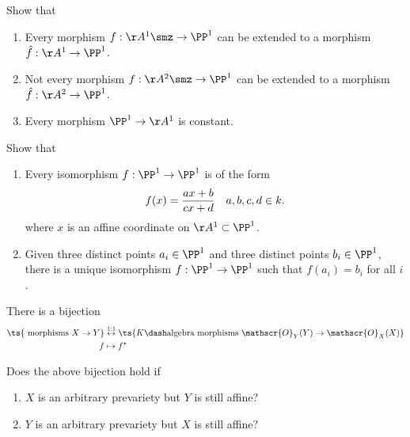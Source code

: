 \begin{exercise}[Gathmann 5.7]

Show that

\begin{enumerate}
\def\labelenumi{\alph{enumi}.}
\item
  Every morphism \(f:\AA^1\smz \to \PP^1\) can be extended to a morphism
  \(\hat f: \AA^1 \to \PP^1\).
\item
  Not every morphism \(f:\AA^2\smz \to \PP^1\) can be extended to a
  morphism \(\hat f: \AA^2 \to \PP^1\).
\item
  Every morphism \(\PP^1\to \AA^1\) is constant.
\end{enumerate}

\end{exercise}

\begin{exercise}[Gathmann 5.8]

Show that

\begin{enumerate}
\def\labelenumi{\alph{enumi}.}
\item
  Every isomorphism \(f:\PP^1\to \PP^1\) is of the form
  \begin{align*}  
  f(x) = {ax+b \over cx+d} && a,b,c,d\in k
  .\end{align*} where \(x\) is an affine coordinate on
  \(\AA^1\subset \PP^1\).
\item
  Given three distinct points \(a_i \in \PP^1\) and three distinct
  points \(b_i \in \PP^1\), there is a unique isomorphism
  \(f:\PP^1 \to \PP^1\) such that \(f(a_i) = b_i\) for all \(i\).
\end{enumerate}

\end{exercise}

\begin{proposition}[?]

There is a bijection
\begin{align*}
\ts{ \text { morphisms } X \rightarrow Y } 
&\stackrel{1: 1}{\leftrightarrow}
\ts{  K\dash\text{algebra morphisms } \mathscr{O}_{Y}(Y) \rightarrow \mathscr{O}_{X}(X) } \\
f &\mapsto f^{*}
\end{align*}

\end{proposition}

\begin{exercise}[Gathmann 5.9]

Does the above bijection hold if

\begin{enumerate}
\def\labelenumi{\alph{enumi}.}
\tightlist
\item
  \(X\) is an arbitrary prevariety but \(Y\) is still affine?
\item
  \(Y\) is an arbitrary prevariety but \(X\) is still affine?
\end{enumerate}

\end{exercise}

